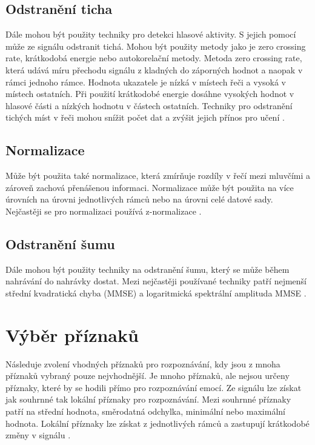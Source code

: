 \documentclass[FM,BP]{tulthesis}
\begin{document}
\subsection{Odstranění ticha}
Dále mohou být použity techniky pro detekci hlasové aktivity. S jejich pomocí může ze signálu odstranit tichá. Mohou být použity metody jako je zero crossing rate, krátkodobá energie nebo autokorelační metody. Metoda zero crossing rate, která udává míru přechodu signálu z kladných do záporných hodnot a naopak v rámci jednoho rámce. Hodnota ukazatele je nízká v místech řeči a vysoká v místech ostatních. Při použití krátkodobé energie dosáhne vysokých hodnot v hlasové části a nízkých hodnotu v částech ostatních. Techniky pro odstranění tichých míst v řeči mohou snížit počet dat a zvýšit jejich přínos pro učení \cite{DBLP:journals/speech/AkcayO20}.

\subsection{Normalizace}
Může být použita také normalizace, která zmírňuje rozdíly v řečí mezi mluvčími a zároveň zachová přenášenou informaci. Normalizace může být použita na více úrovních na úrovni jednotlivých rámců nebo na úrovni celé datové sady. Nejčastěji se pro normalizaci používá z-normalizace \cite{DBLP:journals/speech/AkcayO20}.

\subsection{Odstranění šumu}
Dále mohou být použity techniky na odstranění šumu, který se může během nahrávání do nahrávky dostat. Mezi nejčastěji používané techniky patří nejmenší střední kvadratická chyba (MMSE) a logaritmická spektrální amplituda MMSE \cite{DBLP:journals/speech/AkcayO20}.

\section{Výběr příznaků}
Následuje zvolení vhodných příznaků pro rozpoznávání, kdy jsou z mnoha příznaků vybraný pouze nejvhodnější. Je mnoho příznaků, ale nejsou určeny příznaky, které by se hodili přímo pro rozpoznávání emocí. Ze signálu lze získat jak souhrnné tak lokální příznaky pro rozpoznávání. Mezi souhrnné  příznaky patří na střední hodnota, směrodatná odchylka, minimální nebo maximální hodnota. Lokální příznaky lze získat z jednotlivých rámců a zastupují krátkodobé změny v signálu \cite{DBLP:journals/speech/AkcayO20}.
\end{document}
